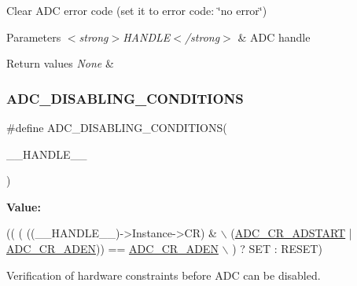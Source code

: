 Clear A\+DC error code (set it to error code\+: \char`\"{}no error\char`\"{}) 


\begin{DoxyParams}{Parameters}
{\em $<$strong$>$\+H\+A\+N\+D\+L\+E$<$/strong$>$} & A\+DC handle \\
\hline
\end{DoxyParams}

\begin{DoxyRetVals}{Return values}
{\em None} & \\
\hline
\end{DoxyRetVals}
\mbox{\label{group___a_d_c___private___macros_ga52dac43dfd7bb8d95df16b30d7567c3f}} 
\subsubsection{\texorpdfstring{A\+D\+C\+\_\+\+D\+I\+S\+A\+B\+L\+I\+N\+G\+\_\+\+C\+O\+N\+D\+I\+T\+I\+O\+NS}{ADC\_DISABLING\_CONDITIONS}}
{\footnotesize\ttfamily \#define A\+D\+C\+\_\+\+D\+I\+S\+A\+B\+L\+I\+N\+G\+\_\+\+C\+O\+N\+D\+I\+T\+I\+O\+NS(\begin{DoxyParamCaption}\item[{}]{\+\_\+\+\_\+\+H\+A\+N\+D\+L\+E\+\_\+\+\_\+ }\end{DoxyParamCaption})}

{\bfseries Value\+:}
\begin{DoxyCode}
(( ( ((\_\_HANDLE\_\_)->Instance->CR) &                                          \(\backslash\)
       (\hyperlink{group___peripheral___registers___bits___definition_ga25021284fb6bfad3e8448edc6ef81218}{ADC\_CR\_ADSTART} | \hyperlink{group___peripheral___registers___bits___definition_ga26fe09dfd6969dd95591942e80cc3d2b}{ADC\_CR\_ADEN})) == \hyperlink{group___peripheral___registers___bits___definition_ga26fe09dfd6969dd95591942e80cc3d2b}{ADC\_CR\_ADEN}                  
              \(\backslash\)
   ) ? SET : RESET)
\end{DoxyCode}


Verification of hardware constraints before A\+DC can be disabled. 


